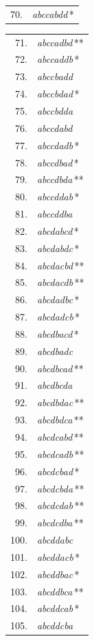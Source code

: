\begin{center}
\begin{minipage}[t]{.31\linewidth}
\begin{tabular}{r@{\ }l}
70. & \emph{abccabdd}\,* \\
\end{tabular}\end{minipage}\hfill%
\begin{minipage}[t]{.31\linewidth}\centering
\begin{tabular}{r@{\ }l}
71. & \emph{abccadbd}\,** \\
72. & \emph{abccaddb}\,* \\
73. & \emph{abccbadd} \\
74. & \emph{abccbdad}\,* \\
75. & \emph{abccbdda} \\
76. & \emph{abccdabd} \\
77. & \emph{abccdadb}\,* \\
78. & \emph{abccdbad}\,* \\
79. & \emph{abccdbda}\,** \\
80. & \emph{abccddab}\,* \\
81. & \emph{abccddba} \\
82. & \emph{abcdabcd}\,* \\
83. & \emph{abcdabdc}\,* \\
84. & \emph{abcdacbd}\,** \\
85. & \emph{abcdacdb}\,** \\
86. & \emph{abcdadbc}\,* \\
87. & \emph{abcdadcb}\,* \\
88. & \emph{abcdbacd}\,* \\
89. & \emph{abcdbadc} \\
90. & \emph{abcdbcad}\,** \\
91. & \emph{abcdbcda} \\
92. & \emph{abcdbdac}\,** \\
93. & \emph{abcdbdca}\,** \\
94. & \emph{abcdcabd}\,** \\
95. & \emph{abcdcadb}\,** \\
96. & \emph{abcdcbad}\,* \\
97. & \emph{abcdcbda}\,** \\
98. & \emph{abcdcdab}\,** \\
99. & \emph{abcdcdba}\,** \\
100. & \emph{abcddabc} \\
101. & \emph{abcddacb}\,* \\
102. & \emph{abcddbac}\,* \\
103. & \emph{abcddbca}\,** \\
104. & \emph{abcddcab}\,* \\
105. & \emph{abcddcba} \\
\end{tabular}\end{minipage}
\end{center}
